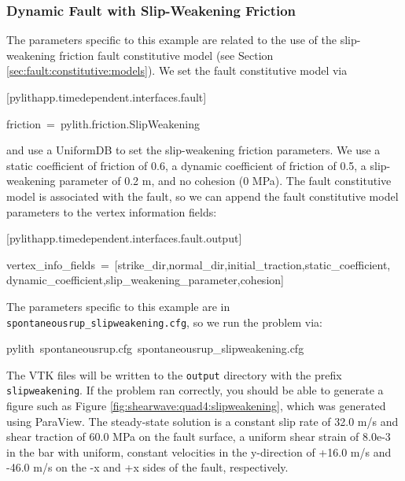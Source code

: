 \subsubsection{Dynamic Fault with Slip-Weakening Friction}

The parameters specific to this example are related to the use of
the slip-weakening friction fault constitutive model (see Section
\ref{sec:fault:constitutive:models}). We set the fault constitutive
model via
\begin{lyxcode}
{[}pylithapp.timedependent.interfaces.fault{]}

friction~=~pylith.friction.SlipWeakening
\end{lyxcode}
and use a UniformDB to set the slip-weakening friction parameters.
We use a static coefficient of friction of 0.6, a dynamic coefficient
of friction of 0.5, a slip-weakening parameter of 0.2 m, and no cohesion
(0 MPa). The fault constitutive model is associated with the fault,
so we can append the fault constitutive model parameters to the vertex
information fields:
\begin{lyxcode}
{[}pylithapp.timedependent.interfaces.fault.output{]}

vertex\_info\_fields~=~{[}strike\_dir,normal\_dir,initial\_traction,static\_coefficient,~\\
dynamic\_coefficient,slip\_weakening\_parameter,cohesion{]}
\end{lyxcode}
The parameters specific to this example are in \texttt{spontaneousrup\_slipweakening.cfg},
so we run the problem via:
\begin{lyxcode}
pylith~spontaneousrup.cfg~spontaneousrup\_slipweakening.cfg
\end{lyxcode}
The VTK files will be written to the \texttt{output} directory with
the prefix \texttt{slipweakening}. If the problem ran correctly, you
should be able to generate a figure such as Figure \ref{fig:shearwave:quad4:slipweakening},
which was generated using ParaView. The steady-state solution is a
constant slip rate of 32.0 m/s and shear traction of 60.0 MPa on the
fault surface, a uniform shear strain of 8.0e-3 in the bar with uniform,
constant velocities in the y-direction of +16.0 m/s and -46.0 m/s
on the -x and +x sides of the fault, respectively.

